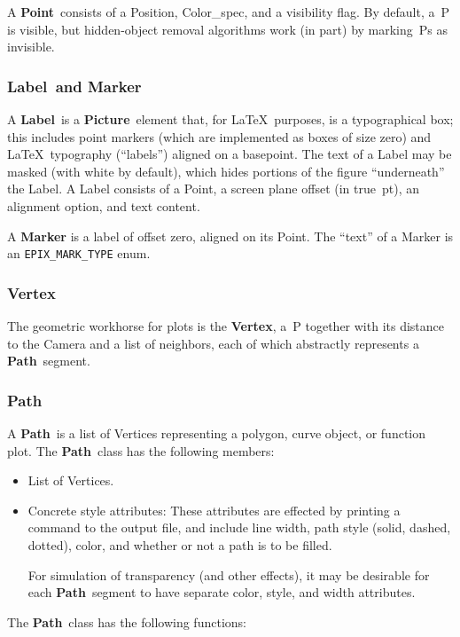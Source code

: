 \documentclass[12pt]{article}
\newcommand{\Class}[1]{\textbf{#1}}
\newcommand{\Label}{\Class{Label}}
\newcommand{\Path}{\Class{Path}}
\newcommand{\Picture}{\Class{Picture}}
\newcommand{\Point}{\Class{Point}}
\newcommand{\bi}{\begin{itemize}}
\newcommand{\ei}{\end{itemize}}
\begin{document}
A \Point\ consists of a Position, Color\_spec, and a visibility flag.
By default, a~P is visible, but hidden-object removal algorithms work
(in part) by marking~Ps as invisible.

\subsubsection*{Label~and Marker}

A \Label\ is a \Picture\ element that, for \LaTeX\ purposes, is a
typographical box; this includes point markers (which are implemented
as boxes of size zero) and \LaTeX\ typography (``labels'') aligned on
a basepoint.  The text of a Label may be masked (with white by
default), which hides portions of the figure ``underneath'' the Label.
A Label consists of a Point, a screen plane offset (in true~pt), an
alignment option, and text content. 

A \Class{Marker} is a label of offset zero, aligned on its Point. The
``text'' of a Marker is an \verb+EPIX_MARK_TYPE+ enum.


\subsubsection*{Vertex}

The geometric workhorse for plots is the \Class{Vertex}, a~P together
with its distance to the Camera and a list of neighbors, each of which
abstractly represents a \Path\ segment.

\subsubsection*{Path}

A \Path\ is a list of Vertices representing a polygon, curve object, or
function plot. The \Path\ class has the following members:

\bi
  \item List of Vertices.

  \item Concrete style attributes: These attributes are effected by
    printing a command to the output file, and include line width,
    path style (solid, dashed, dotted), color, and whether or not a
    path is to be filled.
    
    For simulation of transparency (and other effects), it may be
    desirable for each \Path\ segment to have separate color, style,
    and width attributes.
\ei

\noindent The \Path\ class has the following functions:
\end{document}
